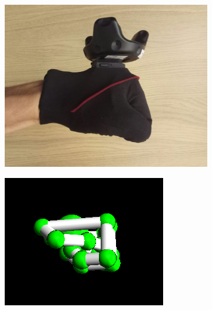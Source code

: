 \documentclass[hyperref, bachelorofscience]{cgvpub}
\begin{document}
\begin{figure}
\begin{subfigure}{.235\linewidth}
		\includegraphics[width=\linewidth]{../pics/hand_radial_ball}
	\end{subfigure}
	\hspace{.01cm}
	\begin{subfigure}{.235\linewidth}
		\includegraphics[width=\linewidth]{../pics/model_radial_ball}
	\end{subfigure}
	\hfill
	\begin{subfigure}{.235\linewidth}

\end{subfigure}
\end{figure}
\end{document}
